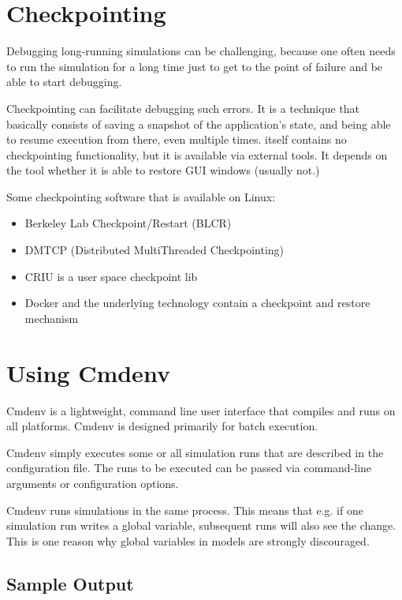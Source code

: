 \section{Checkpointing}
\label{sec:run-sim:checkpointing}

Debugging long-running simulations can be challenging, because one often needs
to run the simulation for a long time just to get to the point of failure and
be able to start debugging. 

Checkpointing can facilitate debugging such errors. It is a technique that
basically consists of saving a snapshot of the application's state, and being
able to resume execution from there, even multiple times. 
{\opp} itself contains no checkpointing functionality, but it is available via
external tools. It depends on the tool whether it is able to restore GUI windows
(usually not.) 

Some checkpointing software that is available on Linux:

\begin{itemize}
  \item Berkeley Lab Checkpoint/Restart (BLCR)
  \item DMTCP (Distributed MultiThreaded Checkpointing)
  \item CRIU is a user space checkpoint lib
  \item Docker and the underlying technology contain a checkpoint and restore mechanism
\end{itemize}


\section{Using Cmdenv}
\label{sec:run-sim:cmdenv}

Cmdenv is a lightweight, command line user interface that
compiles and runs on all platforms. Cmdenv is designed primarily for batch
execution.

Cmdenv simply executes some or all simulation runs that are described
in the configuration file. The runs to be executed can be
passed via command-line arguments or configuration options. 

Cmdenv runs simulations in the same process. This means that e.g. if one
simulation run writes a global variable, subsequent runs will also
see the change. This is one reason why global variables in models are
strongly discouraged.

\subsection{Sample Output}
\label{sec:run-sim:cmdenv:sample-output}

